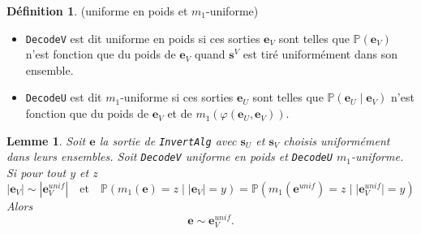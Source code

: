 \documentclass[12pt]{article}
\theoremstyle{plain}
\newtheorem{lemme}[thm]{Lemme}
\theoremstyle{definition}
\newtheorem{defi}[thm]{Définition}
\begin{document}
\begin{defi} (uniforme en poids et $m_1$-uniforme)
\begin{itemize}
\item \verb|DecodeV| est dit uniforme en poids si ces sorties $\mathbf{e}_V$ sont telles que $\mathbb{P}(\mathbf{e}_V)$ n'est fonction que du poids de $\mathbf{e}_V$ quand $\mathbf{s}^V$ est tiré uniformément dans son ensemble.
\item \verb|DecodeU| est dit $m_1$-uniforme si ces sorties $\mathbf{e}_U$ sont telles que $\mathbb{P}(\mathbf{e}_U\; |\;  \mathbf{e}_V)$ n'est fonction que du poids de $\mathbf{e}_V$ et de $m_1(\varphi(\mathbf{e}_U,\mathbf{e}_V))$.
\end{itemize}
\end{defi}

\begin{lemme} Soit $\mathbf{e}$ la sortie de \verb|InvertAlg| avec $\mathbf{s}_U$ et $\mathbf{s}_V$ choisis uniformément dans leurs ensembles. Soit \verb|DecodeV| uniforme en poids et \verb|DecodeU| $m_1$-uniforme. Si pour tout $y$ et $z$ 
$$|\mathbf{e}_V| \sim |\mathbf{e}_V^{unif}|\quad \text{et} \quad\mathbb{P}(m_1(\mathbf{e}) = z\; |\; |\mathbf{e}_V| = y) = \mathbb{P}(m_1(\mathbf{e}^{unif}) = z\; |\; |\mathbf{e}_V^{unif}| = y)$$
Alors
$$ \mathbf{e} \sim \mathbf{e}_V^{unif}.$$
\end{lemme}
\end{document}
